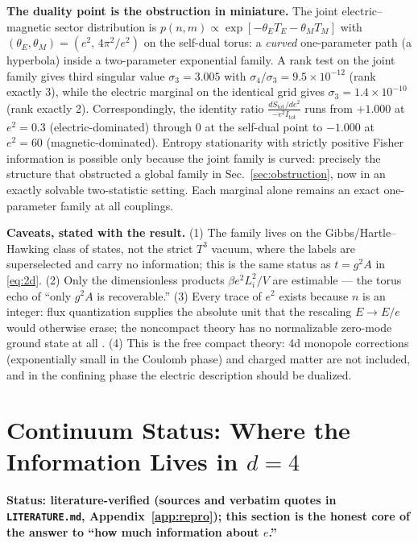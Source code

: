 \documentclass[11pt]{article}
\theoremstyle{remark}
\theoremstyle{plain}
\begin{document}
\textbf{The duality point is the obstruction in miniature.} The joint electric--magnetic sector distribution is $p(n, m) \propto \exp[-\theta_E T_E - \theta_M T_M]$ with $(\theta_E, \theta_M) = (e^2,\, 4\pi^2/e^2)$ on the self-dual torus: a \emph{curved} one-parameter path (a hyperbola) inside a two-parameter exponential family. A rank test on the joint family gives third singular value $\sigma_3 = 3.005$ with $\sigma_4/\sigma_3 = 9.5\times10^{-12}$ (rank exactly 3), while the electric marginal on the identical grid gives $\sigma_3 = 1.4\times10^{-10}$ (rank exactly 2). Correspondingly, the identity ratio $\frac{dS_{\mathrm{tot}}/de^2}{-e^2 I_{\mathrm{tot}}}$ runs from $+1.000$ at $e^2 = 0.3$ (electric-dominated) through $0$ at the self-dual point to $-1.000$ at $e^2 = 60$ (magnetic-dominated). Entropy stationarity with strictly positive Fisher information is possible only because the joint family is curved: precisely the structure that obstructed a global family in Sec.~\ref{sec:obstruction}, now in an exactly solvable two-statistic setting. Each marginal alone remains an exact one-parameter family at all couplings.

\textbf{Caveats, stated with the result.} (1) The family lives on the Gibbs/Hartle--Hawking class of states, not the strict $T^3$ vacuum, where the labels are superselected and carry no information; this is the same status as $t = g^2 A$ in \eqref{eq:2d}. (2) Only the dimensionless products $\beta e^2 L_i^2 / V$ are estimable --- the torus echo of ``only $g^2 A$ is recoverable.'' (3) Every trace of $e^2$ exists because $n$ is an integer: flux quantization supplies the absolute unit that the rescaling $E \to E/e$ would otherwise erase; the noncompact theory has no normalizable zero-mode ground state at all \cite{DW16}. (4) This is the free compact theory: 4d monopole corrections (exponentially small in the Coulomb phase) and charged matter are not included, and in the confining phase the electric description should be dualized.

\section{Continuum Status: Where the Information Lives in \texorpdfstring{$d = 4$}{d = 4}}\label{sec:continuum}

\textbf{Status: literature-verified (sources and verbatim quotes in \texttt{LITERATURE.md}, Appendix~\ref{app:repro}); this section is the honest core of the answer to ``how much information about $e$.''}
\end{document}
